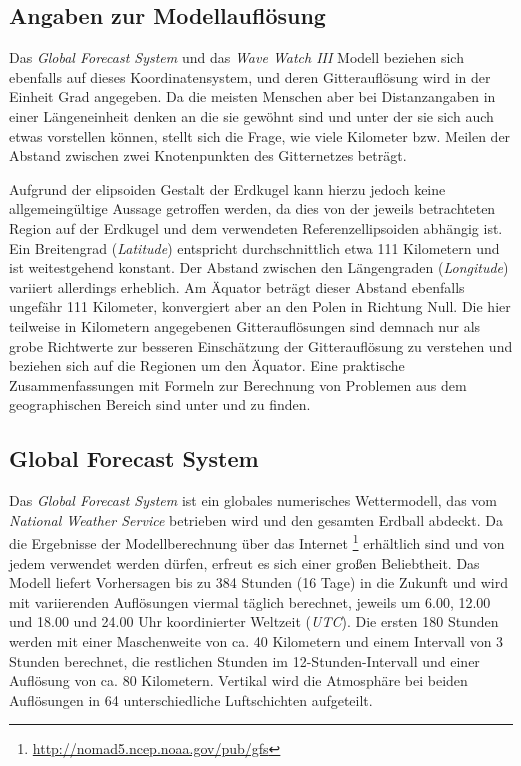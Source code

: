\subsection{Angaben zur Modellauflösung}
Das \textit{Global Forecast System} und das \textit{Wave Watch III}
Modell beziehen sich ebenfalls auf dieses Koordinatensystem, und deren
Gitterauflösung wird in der Einheit Grad angegeben. Da die meisten
Menschen aber bei Distanzangaben in einer Längeneinheit denken an die
sie gewöhnt sind und unter der sie sich auch etwas vorstellen können,
stellt sich die Frage, wie viele Kilometer bzw. Meilen der Abstand
zwischen zwei Knotenpunkten des Gitternetzes beträgt.

Aufgrund der elipsoiden Gestalt der Erdkugel kann hierzu jedoch keine
allgemeingültige Aussage getroffen werden, da dies von der jeweils
betrachteten Region auf der Erdkugel und dem verwendeten
Referenzellipsoiden abhängig ist. Ein Breitengrad (\textit{Latitude})
entspricht durchschnittlich etwa 111 Kilometern und ist weitestgehend
konstant. Der Abstand zwischen den Längengraden (\textit{Longitude})
variiert allerdings erheblich. Am Äquator beträgt dieser Abstand
ebenfalls ungefähr 111 Kilometer, konvergiert aber an den Polen in
Richtung Null. Die hier teilweise in Kilometern angegebenen
Gitterauflösungen sind demnach nur als grobe Richtwerte zur besseren
Einschätzung der Gitterauflösung zu verstehen und beziehen sich auf
die Regionen um den Äquator. Eine praktische Zusammenfassungen mit
Formeln zur Berechnung von Problemen aus dem geographischen Bereich
sind unter \cite{aviation} und \cite{movable_type_scripts} zu finden.

\subsection{Global Forecast System}

Das \textit{Global Forecast System} ist ein globales numerisches
Wettermodell, das vom \textit{National Weather Service} betrieben wird
und den gesamten Erdball abdeckt. Da die Ergebnisse der
Modellberechnung über das Internet
\footnote{\url{http://nomad5.ncep.noaa.gov/pub/gfs}} erhältlich sind
und von jedem verwendet werden dürfen, erfreut es sich einer großen
Beliebtheit. Das Modell liefert Vorhersagen bis zu 384 Stunden (16
Tage) in die Zukunft und wird mit variierenden Auflösungen viermal
täglich berechnet, jeweils um 6.00, 12.00 und 18.00 und 24.00 Uhr
koordinierter Weltzeit (\textit{UTC}). Die ersten 180 Stunden werden
mit einer Maschenweite von ca. 40 Kilometern und einem Intervall von 3
Stunden berechnet, die restlichen Stunden im 12-Stunden-Intervall und
einer Auflösung von ca. 80 Kilometern. Vertikal wird die Atmosphäre
bei beiden Auflösungen in 64 unterschiedliche Luftschichten
aufgeteilt.


